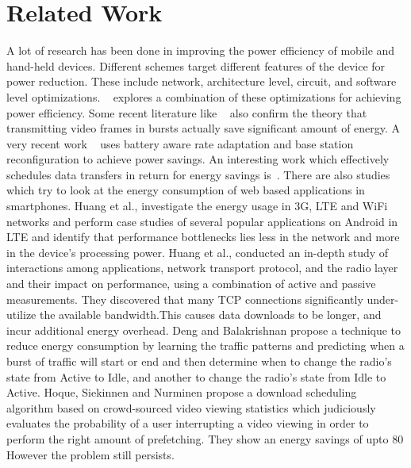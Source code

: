 \section{Related Work}
A lot of research has been done in improving the power efficiency of mobile and hand-held devices. Different schemes target different features of the device for power reduction. These include network, architecture level, circuit, and software level optimizations. ~\cite{mohapatra_mm03} explores a combination of these optimizations for achieving power efficiency. Some recent literature like ~\cite{mobiarch,movid} also confirm the theory that transmitting video frames in bursts actually save significant amount of energy. A very recent work ~\cite{ucsd_wcnc} uses battery aware rate adaptation and base station reconfiguration to achieve power savings. An interesting work which effectively schedules data transfers in return for energy savings is~\cite{balasubramanian_imc09}. There are also studies which try to look at the energy consumption of web based applications in smartphones. Huang et al.,\cite{huang2012close} investigate the energy usage in 3G, LTE and WiFi networks and perform case studies of several popular applications on Android in LTE and identify that performance bottlenecks lies less in the network and more in the device's processing power.
Huang et al.,\cite{huang2013depth} conducted an in-depth study of interactions among applications, network transport protocol, and the radio layer and their impact on performance, using a combination of active and passive measurements. They discovered that many TCP connections significantly under-utilize the available bandwidth.This causes data downloads to be longer, and incur additional energy overhead.  
Deng and Balakrishnan\cite{deng2012traffic} propose a technique to reduce energy consumption by learning the traffic patterns and predicting when a burst of traffic will start or end and then determine when to change the radio's state from Active to Idle, and another to change the radio's state from Idle to Active.
Hoque, Siekinnen and Nurminen\cite{hoque2013using} propose a download scheduling algorithm based on crowd-sourced video viewing statistics which judiciously evaluates the probability of a user interrupting a video viewing in order to perform the right amount of prefetching. They show an energy savings of upto 80%
However the problem still persists. 


